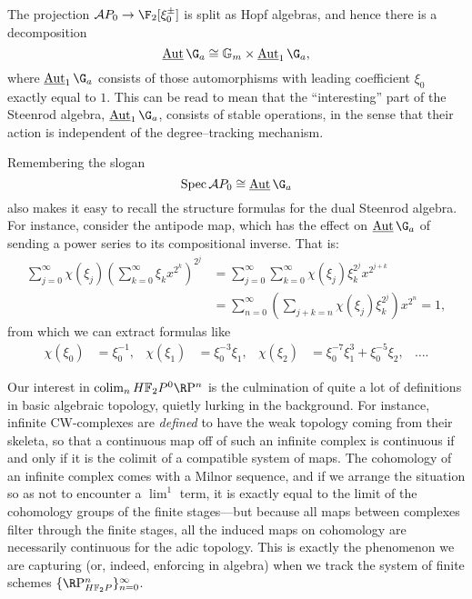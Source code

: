 \begin{remark}\label{AutGaHasStableCoopns}
The projection \(\mathcal AP_0 \to \F_2[\xi_0^\pm]\) is split as Hopf algebras, and hence there is a decomposition \[\InternalAut \G_a \cong \Gm \times \InternalAut_1 \G_a,\] where \(\InternalAut_1 \G_a\) consists of those automorphisms with leading coefficient \(\xi_0\) exactly equal to \(1\).  This can be read to mean that the ``interesting'' part of the Steenrod algebra, \(\InternalAut_1 \G_a\), consists of stable operations, in the sense that their action is independent of the degree--tracking mechanism.
\end{remark}

\begin{example}
Remembering the slogan \[\Spec \mathcal AP_0 \cong \InternalAut \G_a\] also makes it easy to recall the structure formulas for the dual Steenrod algebra.  For instance, consider the antipode map, which has the effect on \(\InternalAut \G_a\) of sending a power series to its compositional inverse.  That is:
\begin{align*}
\sum_{j=0}^\infty \chi(\xi_j) \left( \sum_{k=0}^\infty \xi_k x^{2^k} \right)^{2^j} & = \sum_{j=0}^\infty \sum_{k=0}^\infty \chi(\xi_j) \xi_k^{2^j} x^{2^{j+k}} \\
& = \sum_{n=0}^\infty \left( \sum_{j+k=n} \chi(\xi_j) \xi_k^{2^j} \right) x^{2^n} = 1,
\end{align*}
from which we can extract formulas like
\begin{align*}
\chi(\xi_0) & = \xi_0^{-1}, &
\chi(\xi_1) & = \xi_0^{-3} \xi_1, &
\chi(\xi_2) & = \xi_0^{-7} \xi_1^3 + \xi_0^{-5} \xi_2, &
\ldots.
\end{align*}
\end{example}

\begin{remark}
Our interest in \(\colim_n \HFtwo P^0 \RP^n\) is the culmination of quite a lot of definitions in basic algebraic topology, quietly lurking in the background.  For instance, infinite CW-complexes are \emph{defined} to have the weak topology coming from their skeleta, so that a continuous map off of such an infinite complex is continuous if and only if it is the colimit of a compatible system of maps.  The cohomology of an infinite complex comes with a Milnor sequence, and if we arrange the situation so as not to encounter a \(\lim^1\) term, it is exactly equal to the limit of the cohomology groups of the finite stages---but because all maps between complexes filter through the finite stages, all the induced maps on cohomology are necessarily continuous for the adic topology.  This is exactly the phenomenon we are capturing (or, indeed, enforcing in algebra) when we track the system of finite schemes \(\{\RP^n_{\HFtwo P}\}_{n=0}^\infty\).
\end{remark}

